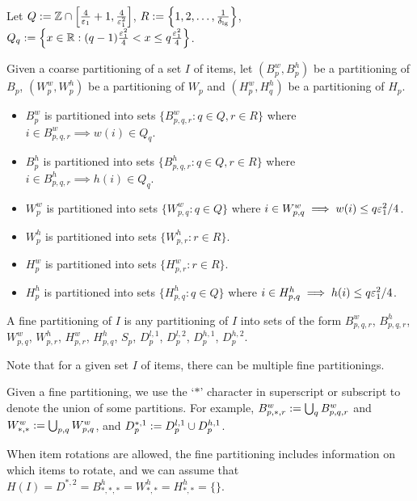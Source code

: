 \begin{definition}
\label{defn:fine-part}
Let $Q := \mathbb{Z} \cap \left[\frac{4}{\varepsilon_1}+1, \frac{4}{\varepsilon_1^2}\right]$,
$R := \left\{1, 2, \ldots, \frac{1}{\delta_{\mathrm{lg}}}\right\}$,
$Q_q := \left\{x \in \mathbb{R}: (q-1)\frac{\varepsilon_1^2}{4} < x
    \le q\frac{\varepsilon_1^2}{4} \right\}$.

Given a coarse partitioning of a set $I$ of items,
let $(B_p^w, B_p^h)$ be a partitioning of $B_p$,
$(W_p^w, W_p^h)$ be a partitioning of $W_p$
and $(H_p^w, H_q^h)$ be a partitioning of $H_p$.

\begin{itemize}
\item $B_p^w$ is partitioned into sets $\{ B_{p,q,r}^w: q \in Q, r \in R \}$
where $i \in B^w_{p,q,r} \implies w(i) \in Q_q$.
\item $B_p^h$ is partitioned into sets $\{ B_{p,q,r}^h: q \in Q, r \in R \}$
where $i \in B^h_{p,q,r} \implies h(i) \in Q_q$.
\item $W_p^w$ is partitioned into sets $\{ W_{p,q}^w: q \in Q \}$
where $i \in W^w_{p,q} \implies w(i) \le q\varepsilon_1^2/4$.
\item $W_p^h$ is partitioned into sets $\{ W_{p,r}^h: r \in R \}$.
\item $H_p^w$ is partitioned into sets $\{ H_{p,r}^w: r \in R \}$.
\item $H_p^h$ is partitioned into sets $\{ H_{p,q}^h: q \in Q \}$
where $i \in H^h_{p,q} \implies h(i) \le q\varepsilon_1^2/4$.
\end{itemize}

A fine partitioning of $I$ is any partitioning of $I$ into sets of the form
$B^w_{p,q,r}$, $B^h_{p,q,r}$, $W^w_{p,q}$, $W^h_{p,r}$, $H^w_{p,r}$, $H^h_{p,q}$,
$S_p$, $D^{l,1}_p$, $D^{l,2}_p$, $D^{h,1}_p$, $D^{h,2}_p$.
\end{definition}

Note that for a given set $I$ of items, there can be multiple fine partitionings.

Given a fine partitioning, we use the `$*$' character in superscript or subscript to denote
the union of some partitions. For example, $B^w_{p,*,r} := \bigcup_q B^w_{p,q,r}$
and $W^w_{*,*} := \bigcup_{p,q} W^w_{p,q}$, and $D^{*,1}_p := D^{l,1}_p \cup D^{h,1}_p$.

When item rotations are allowed, the fine partitioning includes information
on which items to rotate, and we can assume \wLoG{} that
$H(I) = D^{*,2} = B^h_{*,*,*} = W^h_{*,*} = H^h_{*,*} = \{\}$.

